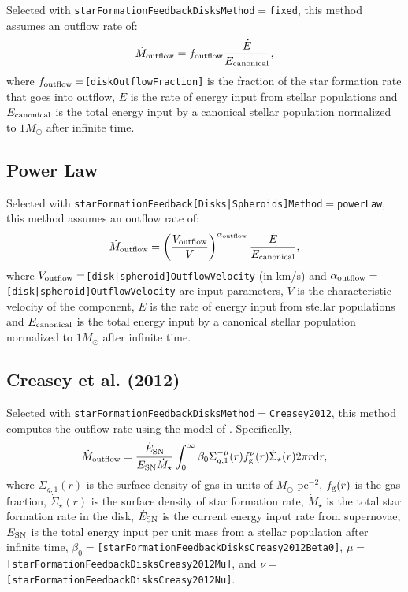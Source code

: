 Selected with {\tt starFormationFeedbackDisksMethod}$=${\tt fixed}, this method assumes an outflow rate of:
\begin{equation}
 \dot{M}_{\rm outflow} = f_{\rm outflow} {\dot{E} \over E_{\rm canonical}},
\end{equation}
where $f_{\rm outflow}=${\tt [diskOutflowFraction]} is the fraction of the star formation rate that goes into outflow, $\dot{E}$ is the rate of energy input from stellar populations and $E_{\rm canonical}$ is the total energy input by a canonical stellar population normalized to $1 M_\odot$ after infinite time.

\subsection{Power Law}

Selected with {\tt starFormationFeedback[Disks|Spheroids]Method}$=${\tt powerLaw}, this method assumes an outflow rate of:
\begin{equation}
 \dot{M}_{\rm outflow} = \left({V_{\rm outflow} \over V}\right)^{\alpha_{\rm outflow}} {\dot{E} \over E_{\rm canonical}},
\end{equation}
where $V_{\rm outflow}=${\tt [disk|spheroid]OutflowVelocity} (in km/s) and $\alpha_{\rm outflow}=${\tt [disk|spheroid]OutflowVelocity} are input parameters, $V$ is the characteristic velocity of the component, $\dot{E}$ is the rate of energy input from stellar populations and $E_{\rm canonical}$ is the total energy input by a canonical stellar population normalized to $1 M_\odot$ after infinite time.

\subsection{Creasey et al. (2012)}

Selected with {\tt starFormationFeedbackDisksMethod}$=${\tt Creasey2012}, this method computes the outflow rate using the model of \cite{creasey_how_2012}. Specifically,
\begin{equation}
\dot{M}_{\rm outflow} = {\dot{E}_{\rm SN} \over E_{\rm SN} \dot{M}_\star} \int_0^\infty \beta_0 \Sigma_{g,1}^{-\mu}(r) f_{\rm g}^\nu(r) \dot{\Sigma}_\star(r) 2 \pi r {\rm d}r,
\end{equation}
where $\Sigma_{g,1}(r)$ is the surface density of gas in units of $M_\odot$ pc$^{-2}$, $f_{\rm g}(r)$ is the gas fraction, $\dot{\Sigma}_\star(r)$ is the surface density of star formation rate, $\dot{M}_\star$ is the total star formation rate in the disk, $\dot{E}_{\rm SN}$ is the current energy input rate from supernovae, $E_{\rm SN}$ is the total energy input per unit mass from a stellar population after infinite time, $\beta_0=${\tt [starFormationFeedbackDisksCreasy2012Beta0]}, $\mu=${\tt [starFormationFeedbackDisksCreasy2012Mu]}, and $\nu=${\tt [starFormationFeedbackDisksCreasy2012Nu]}.

